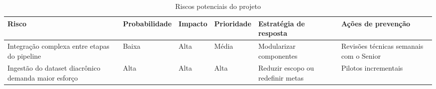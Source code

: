 \begin{table}[htbp]
  \small
  \caption{Riscos potenciais do projeto}          %
  \label{tab:riscos}
  \centering
  \begin{tabularx}{\linewidth}{@{}>{\RaggedRight\arraybackslash}p{4.2cm}
                                    >{\centering\arraybackslash}p{1.9cm}
                                    >{\centering\arraybackslash}p{1.5cm}
                                    >{\centering\arraybackslash}p{1.6cm}
                                    >{\RaggedRight\arraybackslash}p{3.1cm}
                                    >{\RaggedRight\arraybackslash}X@{}}
    \toprule
    Risco & Probabilidade & Impacto & Prioridade & Estratégia de resposta & Ações de prevenção \\ \midrule
    Integração complexa entre etapas do pipeline & Baixa & Alta & Média & Modularizar componentes & Revisões técnicas semanais com o Senior \\[2pt]
    Ingestão do dataset diacrônico demanda maior esforço & Alta & Alta & Alta & Reduzir escopo ou redefinir metas & Pilotos incrementais \\ \bottomrule
  \end{tabularx}
\end{table}
